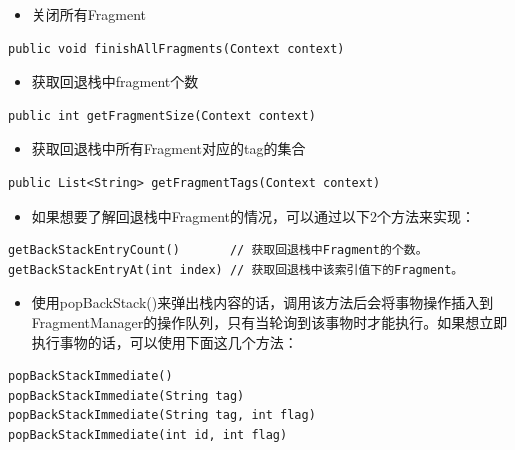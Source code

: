 \documentclass[9pt, b5paaper]{book}
\begin{document}
\begin{itemize}
\item 关闭所有Fragment
\end{itemize}
\begin{verbatim}
public void finishAllFragments(Context context)
\end{verbatim}
\begin{itemize}
\item 获取回退栈中fragment个数
\end{itemize}
\begin{verbatim}
public int getFragmentSize(Context context)
\end{verbatim}
\begin{itemize}
\item 获取回退栈中所有Fragment对应的tag的集合
\end{itemize}
\begin{verbatim}
public List<String> getFragmentTags(Context context)
\end{verbatim}
\begin{itemize}
\item 如果想要了解回退栈中Fragment的情况，可以通过以下2个方法来实现：
\end{itemize}
\begin{verbatim}
getBackStackEntryCount()       // 获取回退栈中Fragment的个数。
getBackStackEntryAt(int index) // 获取回退栈中该索引值下的Fragment。
\end{verbatim}
\begin{itemize}
\item 使用popBackStack()来弹出栈内容的话，调用该方法后会将事物操作插入到FragmentManager的操作队列，只有当轮询到该事物时才能执行。如果想立即执行事物的话，可以使用下面这几个方法：
\end{itemize}
\begin{verbatim}
popBackStackImmediate()
popBackStackImmediate(String tag)
popBackStackImmediate(String tag, int flag)
popBackStackImmediate(int id, int flag)
\end{verbatim}
\end{document}

